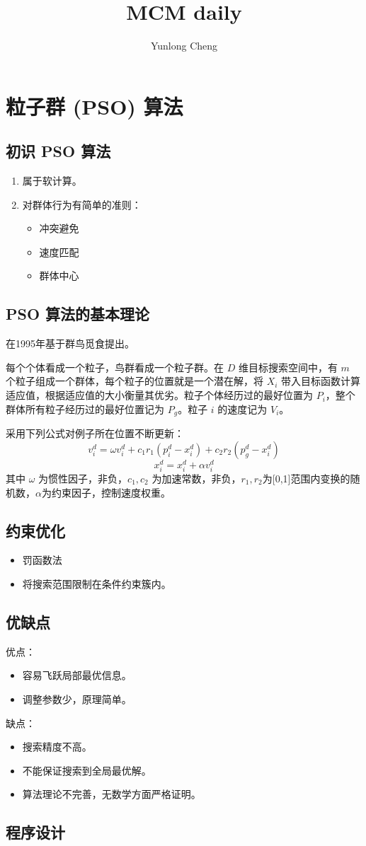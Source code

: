 \documentclass[12pt,a4paper]{article}
\title{MCM daily}
\author{Yunlong Cheng}
\begin{document}
\maketitle
\section{粒子群 (PSO) 算法}
\subsection{初识 PSO 算法}
\begin{enumerate}
  \item 属于软计算。
  \item 对群体行为有简单的准则：
  \begin{itemize}
    \item 冲突避免
    \item 速度匹配
    \item 群体中心
  \end{itemize}
\end{enumerate}
\subsection{PSO 算法的基本理论}
在1995年基于群鸟觅食提出。

每个个体看成一个粒子，鸟群看成一个粒子群。在 $D$ 维目标搜索空间中，有 $m$ 个粒子组成一个群体，每个粒子的位置就是一个潜在解，将 $X_i$ 带入目标函数计算适应值，根据适应值的大小衡量其优劣。粒子个体经历过的最好位置为 $P_i$，整个群体所有粒子经历过的最好位置记为 $P_g$。粒子 $i$ 的速度记为 $V_i$。

采用下列公式对例子所在位置不断更新：
$$v_i^d = \omega v_i^d + c_1r_1(p_i^d - x_i^d) + c_2r_2(p_g^d - x_i^d)$$
$$x_i^d = x_i^d + \alpha v_i^d$$
其中 $\omega$ 为惯性因子，非负，$c_1,c_2$ 为加速常数，非负，$r_1,r_2$为[0,1]范围内变换的随机数，$\alpha$为约束因子，控制速度权重。
\subsection{约束优化}
\begin{itemize}
  \item 罚函数法
  \item 将搜索范围限制在条件约束簇内。
\end{itemize}
\subsection{优缺点}
优点：
\begin{itemize}
  \item 容易飞跃局部最优信息。
  \item 调整参数少，原理简单。
\end{itemize}
缺点：
\begin{itemize}
  \item 搜索精度不高。
  \item 不能保证搜索到全局最优解。
  \item 算法理论不完善，无数学方面严格证明。
\end{itemize}
\subsection{程序设计}
\end{document}
